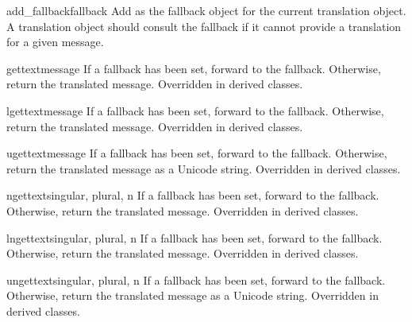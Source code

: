 \begin{methoddesc}[NullTranslations]{add_fallback}{fallback}
Add  as the fallback object for the current translation
object. A translation object should consult the fallback if it cannot
provide a translation for a given message.
\end{methoddesc}

\begin{methoddesc}[NullTranslations]{gettext}{message}
If a fallback has been set, forward  to the fallback.
Otherwise, return the translated message.  Overridden in derived classes.
\end{methoddesc}

\begin{methoddesc}[NullTranslations]{lgettext}{message}
If a fallback has been set, forward  to the fallback.
Otherwise, return the translated message.  Overridden in derived classes.

\end{methoddesc}

\begin{methoddesc}[NullTranslations]{ugettext}{message}
If a fallback has been set, forward  to the fallback.
Otherwise, return the translated message as a Unicode string.
Overridden in derived classes.
\end{methoddesc}

\begin{methoddesc}[NullTranslations]{ngettext}{singular, plural, n}
If a fallback has been set, forward  to the fallback.
Otherwise, return the translated message.  Overridden in derived classes.

\end{methoddesc}

\begin{methoddesc}[NullTranslations]{lngettext}{singular, plural, n}
If a fallback has been set, forward  to the fallback.
Otherwise, return the translated message.  Overridden in derived classes.

\end{methoddesc}

\begin{methoddesc}[NullTranslations]{ungettext}{singular, plural, n}
If a fallback has been set, forward  to the fallback.
Otherwise, return the translated message as a Unicode string.
Overridden in derived classes.

\end{methoddesc}

